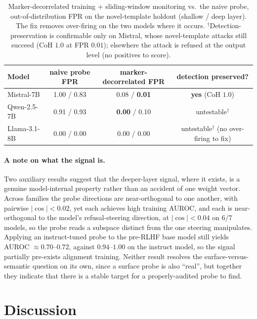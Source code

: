 \documentclass{article}
\begin{document}
\begin{table}[t]
\caption{Marker-decorrelated training + sliding-window monitoring vs.\ the naive probe, out-of-distribution FPR on the novel-template holdout (shallow / deep layer). The fix removes over-firing on the two models where it occurs. $^{\dagger}$Detection-preservation is confirmable only on Mistral, whose novel-template attacks still succeed (CoH $1.0$ at FPR $0.01$); elsewhere the attack is refused at the output level (no positives to score).}
\label{tab:decorr}
\centering
\small
\begin{tabular}{lccc}
\toprule
\textbf{Model} & \textbf{naive probe FPR} & \textbf{marker-decorrelated FPR} & \textbf{detection preserved?} \\
\midrule
Mistral-7B    & 1.00 / 0.83 & 0.08 / \textbf{0.01} & \textbf{yes} (CoH $1.0$) \\
Qwen-2.5-7B   & 0.91 / 0.93 & \textbf{0.00} / 0.10 & untestable$^{\dagger}$ \\
Llama-3.1-8B  & 0.00 / 0.00 & 0.00 / 0.00 & untestable$^{\dagger}$ (no over-firing to fix) \\
\bottomrule
\end{tabular}
\end{table}

\paragraph{A note on what the signal is.} Two auxiliary results suggest that the deeper-layer signal, where it exists, is a genuine model-internal property rather than an accident of one weight vector. Across families the probe directions are near-orthogonal to one another, with pairwise $|\cos|<0.02$, yet each achieves high training AUROC, and each is near-orthogonal to the model's refusal-steering direction, at $|\cos|<0.04$ on $6/7$ models, so the probe reads a subspace distinct from the one steering manipulates. Applying an instruct-tuned probe to the pre-RLHF base model still yields AUROC $\approx 0.70$--$0.72$, against $0.94$--$1.00$ on the instruct model, so the signal partially pre-exists alignment training. Neither result resolves the surface-versus-semantic question on its own, since a surface probe is also ``real'', but together they indicate that there is a stable target for a properly-audited probe to find.

\section{Discussion}
\label{sec:discussion}
\end{document}
